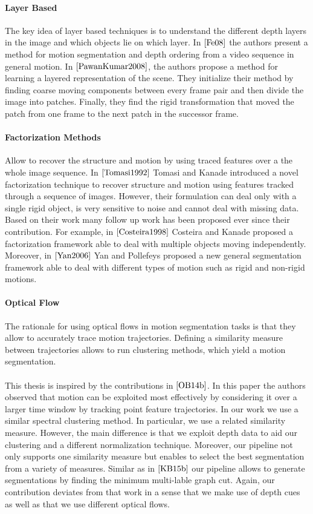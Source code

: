 \paragraph{Layer Based} The key idea of layer based techniques is to understand the different depth layers in the image and which objects lie on which layer. In $\cite{Fe08}$ the authors present a method for motion segmentation and depth ordering from a video sequence in general motion. In $\cite{PawanKumar2008}$, the authors propose a method for learning a layered representation of the scene. They initialize their method by finding coarse moving components between every frame pair and then divide the image into patches. Finally, they find the rigid transformation that moved the patch from one frame to the next patch in the successor frame.

\paragraph{Factorization Methods} Allow to recover the structure and motion by using traced features over a the whole image sequence. In $\cite{Tomasi1992}$ Tomasi and Kanade introduced a novel factorization technique to recover structure and motion using features tracked through a sequence of images. However, their formulation can deal only with a single rigid object, is very sensitive to noise and cannot deal with missing data. Based on their work many follow up work has been proposed ever since their contribution. For example, in $\cite{Costeira1998}$ Costeira and Kanade proposed a factorization framework able to deal with multiple objects moving independently. Moreover, in $\cite{Yan2006}$ Yan and Pollefeys proposed a new general segmentation framework able to deal with different types of motion such as rigid and non-rigid motions. 

\paragraph{Optical Flow}
The rationale for using optical flows in motion segmentation tasks is that they allow to accurately trace motion trajectories. Defining a similarity measure between trajectories allows to run clustering methods, which yield a motion segmentation. \\ \\
This thesis is inspired by the contributions in $\cite{OB14b}$. In this paper the authors observed that motion can be exploited most effectively by considering it over a larger time window by tracking point feature trajectories. In our work we use a similar spectral clustering method. In particular, we use a related similarity measure. However, the main difference is that we exploit depth data to aid our clustering and a different normalization technique. Moreover, our pipeline not only supports one similarity measure but enables to select the best segmentation from a variety of measures. Similar as in $\cite{KB15b}$ our pipeline allows to generate segmentations by finding the minimum multi-lable graph cut. Again, our contribution deviates from that work in a sense that we make use of depth cues as well as that we use different optical flows.

